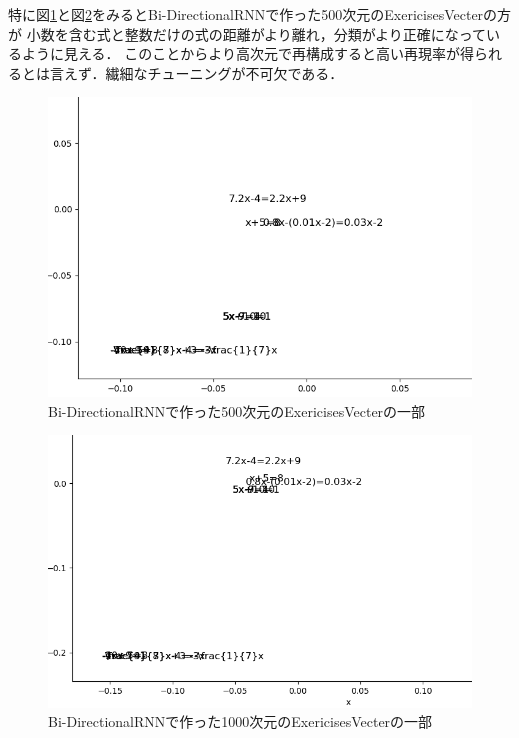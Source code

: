 \documentclass[a4j,11pt,report]{jsbook}
\begin{document}
特に図\ref{fig:Bi500cut2}と図\ref{fig:Bi1000cut}をみるとBi-DirectionalRNNで作った500次元のExericisesVecterの方が
小数を含む式と整数だけの式の距離がより離れ，分類がより正確になっているように見える．
このことからより高次元で再構成すると高い再現率が得られるとは言えず．繊細なチューニングが不可欠である．

\begin{center}
  \begin{figure}[H]
    \centering
    \includegraphics[width=\linewidth]{image/detial/pca_formula_Bi_final_22x500_1_cut.png}
    \caption{Bi-DirectionalRNNで作った500次元のExericisesVecterの一部}
    \label{fig:Bi500cut2}
  \end{figure}
\end{center}


\begin{center}
  \begin{figure}[H]
    \centering
    \includegraphics[width=\linewidth]{image/detial/pca_formula_Bi_final_22x1000_1_cut0.png}
    \caption{Bi-DirectionalRNNで作った1000次元のExericisesVecterの一部}
    \label{fig:Bi1000cut}
  \end{figure}
\end{center}
\end{document}
